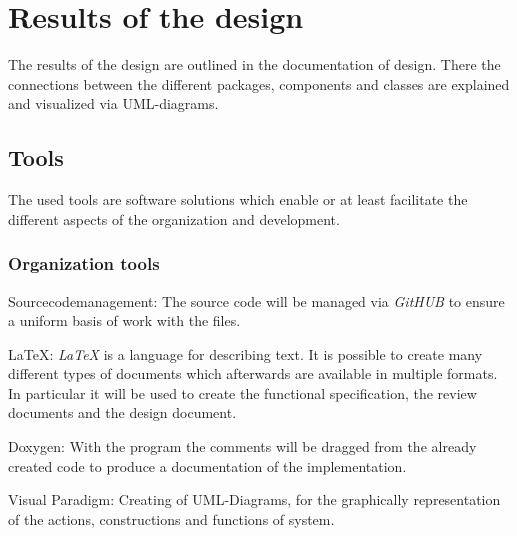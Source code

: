 \section{Results of the design}

The results of the design are outlined in the documentation of design.
There the connections between the different packages, components and classes are explained and visualized via UML-diagrams. 

\subsection{Tools} 

The used tools are software solutions which enable or at least facilitate the different aspects of the organization and development.

\subsubsection{Organization tools}
	\begin{aims}
		
		\item[Sourcecodemanagement:] The source code will be managed via \textit{GitHUB} to ensure a uniform basis of work with the files.
		
		\item[LaTeX:] \textit{LaTeX} is a language for describing text. It is possible to create many different types of documents which afterwards are available in multiple formats. In particular it will be used to create the functional specification, the review documents and the design document.
		
		\item[Doxygen:] With the program the comments will be dragged from the already created code to produce a documentation of the implementation.
		
		\item[Visual Paradigm:] Creating of UML-Diagrams, for the graphically representation of the actions, constructions and functions of  system. 
	\end{aims}

